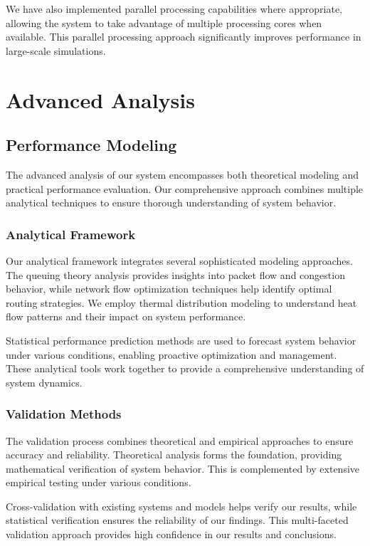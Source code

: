 \documentclass[12pt]{article}
\begin{document}
We have also implemented parallel processing capabilities where appropriate, allowing the system to take advantage of multiple processing cores when available. This parallel processing approach significantly improves performance in large-scale simulations.

\section{Advanced Analysis}
\subsection{Performance Modeling}
The advanced analysis of our system encompasses both theoretical modeling and practical performance evaluation. Our comprehensive approach combines multiple analytical techniques to ensure thorough understanding of system behavior.

\subsubsection{Analytical Framework}
Our analytical framework integrates several sophisticated modeling approaches. The queuing theory analysis provides insights into packet flow and congestion behavior, while network flow optimization techniques help identify optimal routing strategies. We employ thermal distribution modeling to understand heat flow patterns and their impact on system performance.

Statistical performance prediction methods are used to forecast system behavior under various conditions, enabling proactive optimization and management. These analytical tools work together to provide a comprehensive understanding of system dynamics.

\subsubsection{Validation Methods}
The validation process combines theoretical and empirical approaches to ensure accuracy and reliability. Theoretical analysis forms the foundation, providing mathematical verification of system behavior. This is complemented by extensive empirical testing under various conditions.

Cross-validation with existing systems and models helps verify our results, while statistical verification ensures the reliability of our findings. This multi-faceted validation approach provides high confidence in our results and conclusions.
\end{document}
